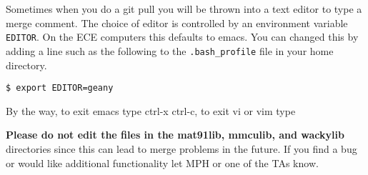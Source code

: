 Sometimes when you do a git pull you will be thrown into a text editor
to type a merge comment. The choice of editor is controlled by an
environment variable \texttt{EDITOR}. On the ECE computers this defaults
to emacs. You can changed this by adding a line such as the following to
the \texttt{.bash\_profile} file in your home directory.

\begin{verbatim}
$ export EDITOR=geany
\end{verbatim}

By the way, to exit emacs type ctrl-x ctrl-c, to exit vi or vim type 

\textbf{Please do not edit the files in the mat91lib, mmculib, and
wackylib} directories since this can lead to merge problems in the
future. If you find a bug or would like additional functionality let MPH
or one of the TAs know.
